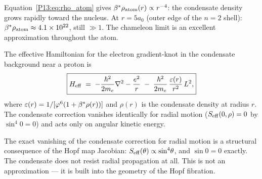 

\begin{remark}
\label{P13:rem:radial_dep}
Equation~\eqref{P13:eq:rho_atom} gives $\beta^{*}\rho_{\rm atom}(r)\propto r^{-4}$:
the condensate density grows rapidly toward the nucleus.
At $r = 5a_0$ (outer edge of the $n=2$ shell):
$\beta^{*}\rho_{\rm atom}\approx4.1\times10^{22}$, still $\gg1$.
The chameleon limit is an excellent approximation throughout the atom.
\end{remark}

\begin{theorem}
\label{P13:thm:modified_H}
The effective Hamiltonian for the electron gradient-knot in the
condensate background near a proton is
\begin{equation}
  \boxed{
  H_{\mathrm{eff}}
  \;=\; -\frac{\hbar^2}{2m_e}\nabla^2 - \frac{e^2}{r}
  \;-\; \frac{\hbar^2}{2m_e}\,\frac{\varepsilon(r)}{r^2}\,L^2,
  }
  \label{P13:eq:H_eff}
\end{equation}
where $\varepsilon(r) = 1/[\varphi^6(1+\beta^{*}\rho(r))]$ and $\rho(r)$ is the
condensate density at radius $r$.
The condensate correction vanishes identically for radial motion
($S_{\mathrm{eff}}(0,\rho)=0$ by $\sin^4\!0=0$) and acts only on angular
kinetic energy.
\end{theorem}

\begin{remark}
\label{P13:rem:zero_radial}
The exact vanishing of the condensate correction for radial motion
is a structural consequence of the Hopf map Jacobian:
$S_{\mathrm{eff}}(\theta)\propto\sin^4\!\theta$, and $\sin\!0=0$ exactly.
The condensate does not resist radial propagation at all.
This is not an approximation --- it is built into the geometry
of the Hopf fibration.
\end{remark}


